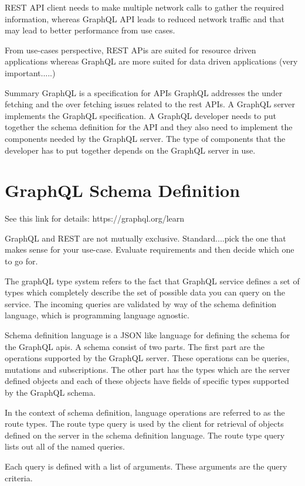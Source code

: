 REST API client needs to make multiple network calls to gather the required information, whereas GraphQL API leads to reduced network traffic and that may lead to better performance from use cases.

From use-cases perspective, REST APis are suited for resource driven applications whereas GraphQL are more suited for data driven applications (very important.....)

Summary
GraphQL is a specification for APIs
GraphQL addresses the under fetching and the over fetching issues related to the rest APIs.
A GraphQL server implements the GraphQL specification.
A GraphQL developer needs to put together the schema definition for the API and they also need to implement the components needed by the GraphQL server.
The type of components that the developer has to put together depends on the GraphQL server in use.

\section{GraphQL Schema Definition}
See this link for details: https://graphql.org/learn

GraphQL and REST are not mutually exclusive.
Standard....pick the one that makes sense for your use-case.
Evaluate requirements and then decide which one to go for.

The graphQL type system refers to the fact that GraphQL service defines a set of types which completely describe the set of possible data you can query on the service.
The incoming queries are validated by way of the schema definition language, which is programming language agnostic.

Schema definition language is a JSON like language for defining the schema for the GraphQL apis.
A schema consist of two parts.
The first part are the operations supported by the GraphQL server.
These operations can be queries, mutations and subscriptions.
The other part has the types which are the server defined objects and each of these objects have fields of specific types supported by the GraphQL schema.

In the context of schema definition, language operations are referred to as the route types.
The route type query is used by the client for retrieval of objects defined on the server in the schema definition language.
The route type query lists out all of the named queries.

Each query is defined with a list of arguments.
These arguments are the query criteria.

